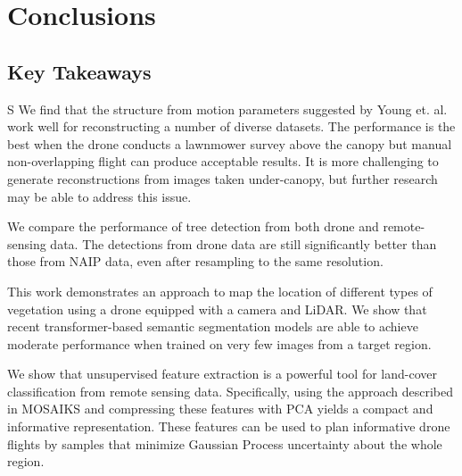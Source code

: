 
\chapter{Conclusions} \label{chapConclusions}
\section{Key Takeaways}S
We find that the structure from motion parameters suggested by Young et. al. \cite{Young2022} work well for reconstructing a number of diverse datasets. The performance is the best when the drone conducts a lawnmower survey above the canopy but manual non-overlapping flight can produce acceptable results. It is more challenging to generate reconstructions from images taken under-canopy, but further research may be able to address this issue.

We compare the performance of tree detection from both drone and remote-sensing data. The detections from drone data are still significantly better than those from NAIP data, even after resampling to the same resolution. 

This work demonstrates an approach to map the location of different types of vegetation using a drone equipped with a camera and LiDAR. We show that recent transformer-based semantic segmentation models are able to achieve moderate performance when trained on very few images from a target region.

We show that unsupervised feature extraction is a powerful tool for land-cover classification from remote sensing data. Specifically, using the approach described in MOSAIKS and compressing these features with PCA yields a compact and informative representation. These features can be used to plan informative drone flights by samples that minimize Gaussian Process uncertainty about the whole region.  


